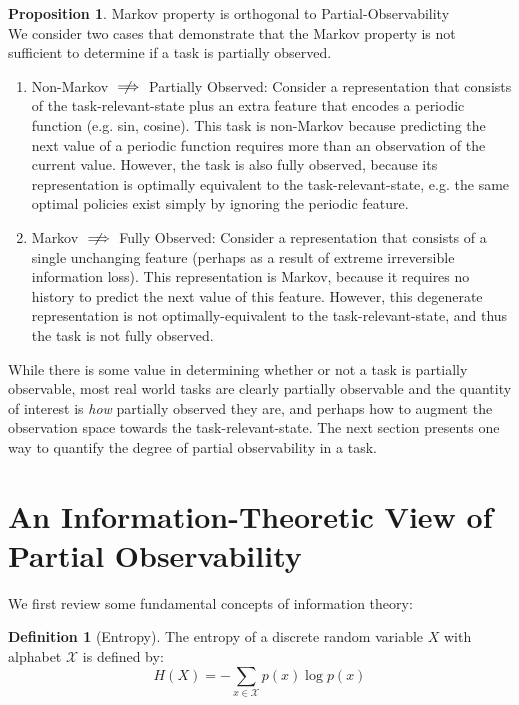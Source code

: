\documentclass{article} %
\theoremstyle{definition}
\newtheorem{definition}{Definition}[section]
\newtheorem{prop}{Proposition}
\begin{document}
\begin{prop} Markov property is orthogonal to Partial-Observability\\
We consider two cases that demonstrate that the Markov property is not
sufficient to determine if a task is partially observed.
\begin{enumerate}
\item Non-Markov $\centernot\implies$ Partially Observed: Consider a
  representation that consists of the task-relevant-state plus an
  extra feature that encodes a periodic function (e.g. sin,
  cosine). This task is non-Markov because predicting the next value
  of a periodic function requires more than an observation of the
  current value. However, the task is also fully observed, because its
  representation is optimally equivalent to the task-relevant-state,
  e.g. the same optimal policies exist simply by ignoring the periodic
  feature.
\item Markov $\centernot\implies$ Fully Observed: Consider a representation
  that consists of a single unchanging feature (perhaps as a result of
  extreme irreversible information loss). This representation is
  Markov, because it requires no history to predict the next value of
  this feature. However, this degenerate representation is not
  optimally-equivalent to the task-relevant-state, and thus the task
  is not fully observed.
\end{enumerate}
\end{prop}

While there is some value in determining whether or not a task is
partially observable, most real world tasks are clearly partially
observable and the quantity of interest is \textit{how} partially
observed they are, and perhaps how to augment the observation space
towards the task-relevant-state. The next section presents one way to
quantify the degree of partial observability in a task.

\section{An Information-Theoretic View of Partial Observability}
We first review some fundamental concepts of information theory:

\begin{definition}[Entropy]
\label{def:entropy}
The entropy of a discrete random variable $X$ with alphabet $\mathcal{X}$ is
defined by:
\[
H(X) = -\sum_{x\in \mathcal{X}} p(x) \log p(x)
\]
\end{definition}
\end{document}
